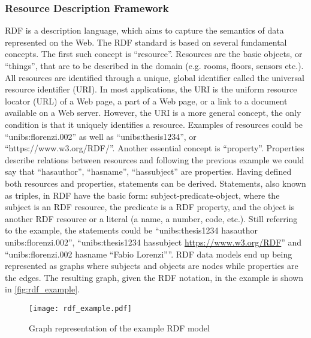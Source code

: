 \subsubsection{Resource Description Framework} \label{subsec:rdf}
RDF \cite{rdf_standard} is a description language, which aims to capture the semantics of data represented on the Web. The RDF standard is based on several fundamental concepts. The first such concept is ``resource''. Resources are the basic objects, or ``things'', that are to be described in the domain (e.g. rooms, floors, sensors etc.). All resources are identified through a unique, global identifier called the universal resource identifier (URI). In most applications, the URI is the uniform resource locator (URL) of a Web page, a part of a Web page, or a link to a document available on a Web server. However, the URI is a more general concept, the only condition is that it uniquely identifies a resource. Examples of resources could be ``unibs:florenzi.002'' as well as ``unibs:thesis1234'', or ``https://www.w3.org/RDF/''.  Another essential concept is ``property''. Properties describe relations between resources and following the previous example we could say that ``has\textunderscore author'', ``has\textunderscore name'', ``has\textunderscore subject'' are properties.  Having defined both resources and properties, statements can be derived. Statements, also known as triples, in RDF have the basic form: subject-predicate-object, where the subject is an RDF resource, the predicate is a RDF property, and the object is another RDF resource or a literal (a name, a number, code, etc.). Still referring to the example, the statements could be ``unibs:thesis1234 has\textunderscore author unibs:florenzi.002'', ``unibs:thesis1234 has\textunderscore subject \url{https://www.w3.org/RDF}'' and ``unibs:florenzi.002 has\textunderscore name ``Fabio Lorenzi''''.
RDF data models end up being represented as graphs where subjects and objects are nodes while properties are the edges. The resulting graph, given the RDF notation, in the example is shown in \autoref{fig:rdf_example}.

\begin{figure}
  \centering
  \texttt{[image: rdf\_example.pdf]}
  \caption{Graph representation of the example RDF model}
  \label{fig:rdf_example}
\end{figure}

